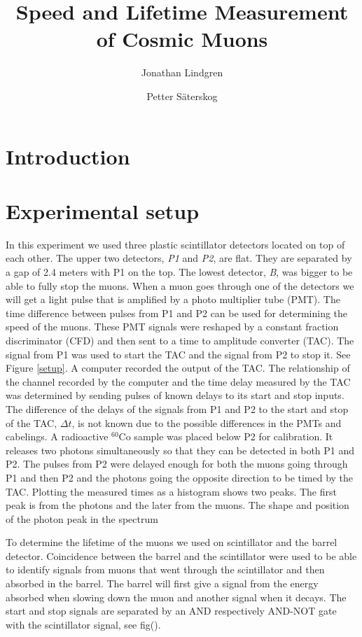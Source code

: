 \documentclass[10pt,twocolumn]{article}
\title{Speed and Lifetime Measurement of Cosmic Muons}
\author{Jonathan Lindgren \and Petter Säterskog}
\begin{document}
\maketitle
\section{Introduction}

\section{Experimental setup}
In this experiment we used three plastic scintillator detectors located on top of each other. The upper two detectors, \emph{P1} and \emph{P2}, are flat. They are separated by a gap of 2.4 meters with P1 on the top. The lowest detector, \emph{B}, was bigger to be able to fully stop the muons. When a muon goes through one of the detectors we will get a light pulse that is amplified by a photo multiplier tube (PMT). The time difference between pulses from P1 and P2 can be used for determining the speed of the muons. These PMT signals were reshaped by a constant fraction discriminator (CFD) and then sent to a time to amplitude converter (TAC). The signal from P1 was used to start the TAC and the signal from P2 to stop it. See Figure \ref{setup}. A computer recorded the output of the TAC. The relationship of the channel recorded by the computer and the time delay measured by the TAC was determined by sending pulses of known delays to its start and stop inputs.\\  %
The difference of the delays of the signals from P1 and P2 to the start and stop of the TAC, $\Delta t$, is not known due to the possible differences in the PMTs and cabelings. A radioactive $^{60}$Co sample was placed below P2 for calibration. It releases two photons simultaneously so that they can be detected in both P1 and P2. The pulses from P2 were delayed enough for both the muons going through P1 and then P2 and the photons going the opposite direction to be timed by the TAC. Plotting the measured times as a histogram shows two peaks. The first peak is from the photons and the later from the muons. The shape and position of the photon peak in the spectrum 


To determine the lifetime of the muons we used on scintillator and the barrel detector. Coincidence between the barrel and the scintillator were used to be able to identify signals from muons that went through the scintillator and then absorbed in the barrel. The barrel will first give a signal from the energy absorbed when slowing down the muon and another signal when it decays. The start and stop signals are separated by an AND respectively AND-NOT gate with the scintillator signal, see fig().
\end{document}
